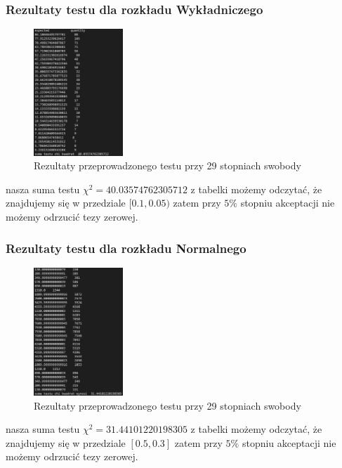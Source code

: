 \documentclass[9pt]{beamer}
\begin{document}
\begin{frame}
  \frametitle{Rezultaty testu dla rozkładu Wykładniczego}
  \begin{figure}[h!]
    \centering
    \includegraphics[width=0.3\textwidth]{assets/wykl.PNG}
      \caption{Rezultaty przeprowadzonego testu przy 29 stopniach swobody}
  \end{figure}
  nasza suma testu $\chi^2 = 40.03574762305712$ z tabelki możemy odczytać, że znajdujemy się w przedziale $[0.1, 0.05)$ zatem przy $5\%$ stopniu akceptacji nie możemy odrzucić tezy zerowej.
\end{frame}
\begin{frame}
  \frametitle{Rezultaty testu dla rozkładu Normalnego}
  \begin{figure}[h!]
    \centering
    \includegraphics[width=0.3\textwidth]{assets/norm.PNG}
      \caption{Rezultaty przeprowadzonego testu przy 29 stopniach swobody}
  \end{figure}
  nasza suma testu $\chi^2 = 31.44101220198305$ z tabelki możemy odczytać, że znajdujemy się w przedziale $[0.5, 0.3]$ zatem przy $5\%$ stopniu akceptacji nie możemy odrzucić tezy zerowej.
\end{frame}
\end{document}
